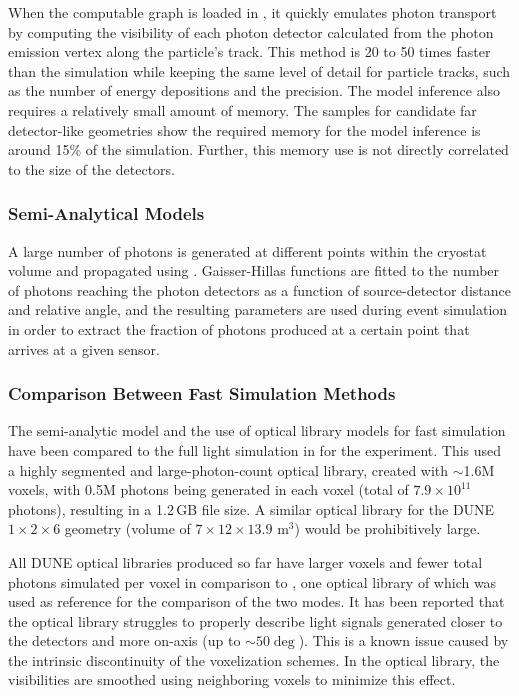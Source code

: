 \documentclass[../main-v1.tex]{subfiles}
\begin{document}
When the computable graph is loaded in , it quickly emulates photon transport by  computing the visibility %
 of each photon detector calculated from  the photon emission vertex along the particle's track.
This method is 20 to 50 times faster than the  simulation while keeping the same level of detail for particle tracks, such as the number of energy depositions and the precision.
The model inference also requires a relatively small amount of memory. The samples for candidate  %
far detector-like geometries show the required memory for the model inference is around 15\% of the  simulation. Further, this memory use is not directly correlated to the size of the detectors. %

\subsubsection{Semi-Analytical Models}
A large number of photons is generated at different points within the cryostat volume and propagated using . Gaisser-Hillas functions are fitted to the  number of %
photons reaching the photon detectors as a function of source-detector distance and relative angle, and the resulting parameters are used during event simulation  in order %
to extract the fraction of photons produced at a certain point that arrives at a given sensor.
 
\subsubsection{Comparison Between Fast Simulation Methods}
The semi-analytic model and the use of  optical library models for fast simulation have been compared to the full light simulation in  for the  experiment. This used a highly segmented and large-photon-count optical library, created with $\sim$1.6M voxels, with 0.5M photons being %
generated in each voxel (total of $7.9 \times  10^{11}$ photons), resulting in a  1.2\,GB file size. A similar optical library for the DUNE $1\times2\times6$ geometry (volume of $7 \times 12 \times 13.9$ m$^3$) would be prohibitively large.

All DUNE optical libraries produced so far have larger voxels and fewer total photons simulated per voxel %
in comparison to  , one optical library of which 
was used as reference for the comparison of the two modes.
It has been reported that the optical library struggles to properly describe light signals generated closer to the detectors and more on-axis (up to $\sim50\deg$). This is a known issue caused by the intrinsic discontinuity of the voxelization schemes. In the  optical library, the visibilities are smoothed using neighboring voxels  to minimize this effect. 
\end{document}
